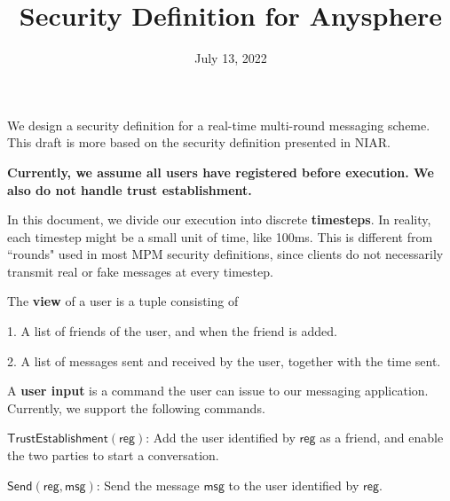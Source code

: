 \documentclass{article}
\title{Security Definition for Anysphere}
\date{July 13, 2022}
\newcommand{\msg}{\mathsf{msg}}
\newcommand{\reg}{\mathsf{reg}}
\begin{document}
\maketitle
We design a security definition for a real-time multi-round messaging scheme. This draft is more based on the security definition presented in NIAR.

\textbf{Currently, we assume all users have registered before execution. We also do not handle trust establishment.}
\begin{definition}
In this document, we divide our execution into discrete \textbf{timesteps}. In reality, each timestep might be a small unit of time, like 100ms. This is different from ``rounds" used in most MPM security definitions, since clients do not necessarily transmit real or fake messages at every timestep.
\end{definition}
\begin{definition}
The \textbf{view} of a user is a tuple consisting of

1. A list of friends of the user, and when the friend is added.

2. A list of messages sent and received by the user, together with the time sent.
\end{definition}
\begin{definition}
A \textbf{user input} is a command the user can issue to our messaging application. Currently, we support the following commands.

$\mathsf{TrustEstablishment}(\reg)$: Add the user identified by $\reg$ as a friend, and enable the two parties to start a conversation.

$\mathsf{Send}(\reg, \msg)$: Send the message $\msg$ to the user identified by $\reg$.


\end{definition}
\end{document}
